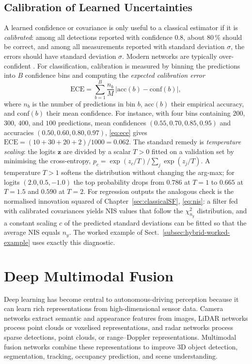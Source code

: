 \subsection{Calibration of Learned Uncertainties}
\label{subsec:calibration}
A learned confidence or covariance is only useful to a classical estimator if it is \emph{calibrated}: among all detections reported with confidence $0.8$, about $80\,\%$ should be correct, and among all measurements reported with standard deviation $\sigma$, the errors should have standard deviation $\sigma$. Modern networks are typically over-confident \cite{guo2017_calibration}. For classification, calibration is measured by binning the predictions into $B$ confidence bins and computing the \emph{expected calibration error}
\begin{equation}
\mathrm{ECE}=\sum_{b=1}^{B}\frac{n_b}{M}\,\big|\mathrm{acc}(b)-\mathrm{conf}(b)\big| ,
\label{eq:ece}
\end{equation}
where $n_b$ is the number of predictions in bin $b$, $\mathrm{acc}(b)$ their empirical accuracy, and $\mathrm{conf}(b)$ their mean confidence. For instance, with four bins containing $200$, $300$, $400$, and $100$ predictions, mean confidences $(0.55,0.70,0.85,0.95)$ and accuracies $(0.50,0.60,0.80,0.97)$, \eqref{eq:ece} gives $\mathrm{ECE}=(10+30+20+2)/1000=0.062$. The standard remedy is \emph{temperature scaling}: the logits $\mathbf{z}$ are divided by a scalar $T>0$ fitted on a validation set by minimising the cross-entropy, $p_c=\exp(z_c/T)/\sum_j\exp(z_j/T)$. A temperature $T>1$ softens the distribution without changing the arg-max; for logits $(2.0,0.5,-1.0)$ the top probability drops from $0.786$ at $T=1$ to $0.665$ at $T=1.5$ and $0.590$ at $T=2$. For regression outputs the analogous check is the normalised innovation squared of Chapter~\ref{sec:classicalSF}, \eqref{eq:nis}: a filter fed with calibrated covariances yields NIS values that follow the $\chi^{2}_{n_y}$ distribution, and a constant scaling $c$ of the predicted standard deviations can be fitted so that the average NIS equals $n_y$. The worked example of Sect.~\ref{subsec:hybrid-worked-example} uses exactly this diagnostic.

\section{Deep Multimodal Fusion}
%
Deep learning has become central to autonomous-driving perception because it can learn rich representations from high-dimensional sensor data. Camera networks extract semantic and appearance features from images, LiDAR networks process point clouds or voxelised representations, and radar networks process sparse detections, point clouds, or range--Doppler representations. Multimodal fusion networks combine these representations to improve 3D object detection, segmentation, tracking, occupancy prediction, and scene understanding.

